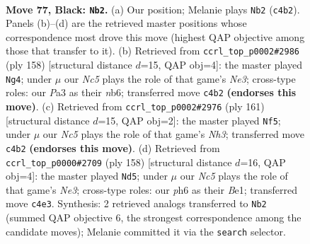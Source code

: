 \documentclass[11pt]{article}
\begin{document}
\clearpage

\begin{figure}[p]\centering
\begin{subfigure}{0.46\textwidth}\centering
\resizebox{\linewidth}{!}{%
\newchessgame
\chessboard[
  setfen={8/7R/6pP/3k1p2/2n2P2/p7/7K/8 b - - 1 77},
  showmover=false,
  pgfstyle=straightmove, color=movearrow, markmove={c4-b2}
]}
\caption{}
\end{subfigure}\hfill
\begin{subfigure}{0.46\textwidth}\centering
\resizebox{\linewidth}{!}{%
\newchessgame
\chessboard[
  setfen={8/8/1n4k1/6p1/4K2p/4N2P/6P1/8 w - - 9 80},
  showmover=false,
  pgfstyle=straightmove, color=movearrow, markmove={e3-g4}
]}
\caption{}
\end{subfigure}
\\[4pt]
\begin{subfigure}{0.46\textwidth}\centering
\resizebox{\linewidth}{!}{%
\newchessgame
\chessboard[
  setfen={8/6k1/4p1pn/8/5P2/7P/R5K1/8 b - - 30 81},
  showmover=false,
  pgfstyle=straightmove, color=movearrow, markmove={h6-f5}
]}
\caption{}
\end{subfigure}\hfill
\begin{subfigure}{0.46\textwidth}\centering
\resizebox{\linewidth}{!}{%
\newchessgame
\chessboard[
  setfen={8/3k4/5p2/6p1/6P1/3KN3/r7/4B3 w - - 9 80},
  showmover=false,
  pgfstyle=straightmove, color=movearrow, markmove={e3-d5}
]}
\caption{}
\end{subfigure}
\caption{\textbf{Move 77, Black: \texttt{Nb2}.} (a) Our position; Melanie plays \texttt{Nb2} (\texttt{c4b2}). Panels (b)--(d) are the retrieved master positions whose correspondence most drove this move (highest QAP objective among those that transfer to it). (b) Retrieved from \texttt{ccrl\_top\_p0002\#2986} (ply 158) [structural distance $d$=15, QAP obj=4]: the master played \texttt{Ng4}; under $\mu$ our \emph{Nc5} plays the role of that game's \emph{Ne3}; cross-type roles: our \emph{P}a3 as their \emph{n}b6; transferred move \texttt{c4b2} \textbf{(endorses this move)}. (c) Retrieved from \texttt{ccrl\_top\_p0002\#2976} (ply 161) [structural distance $d$=15, QAP obj=2]: the master played \texttt{Nf5}; under $\mu$ our \emph{Nc5} plays the role of that game's \emph{Nh3}; transferred move \texttt{c4b2} \textbf{(endorses this move)}. (d) Retrieved from \texttt{ccrl\_top\_p0000\#2709} (ply 158) [structural distance $d$=16, QAP obj=4]: the master played \texttt{Nd5}; under $\mu$ our \emph{Nc5} plays the role of that game's \emph{Ne3}; cross-type roles: our \emph{p}h6 as their \emph{B}e1; transferred move \texttt{c4e3}. Synthesis: 2 retrieved analogs transferred to \texttt{Nb2} (summed QAP objective 6, the strongest correspondence among the candidate moves); Melanie committed it via the \texttt{search} selector.}
\label{fig:thought-m153}
\end{figure}
\end{document}
